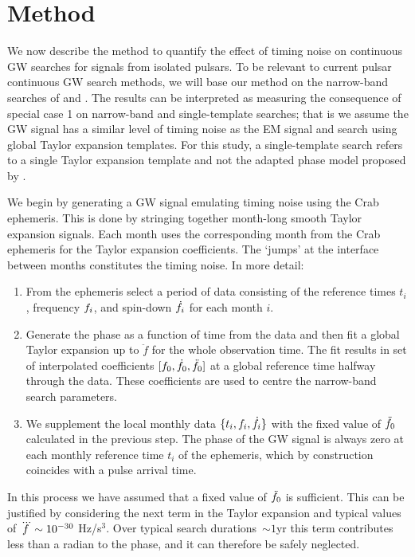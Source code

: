 \documentclass[../full_thesis/full_thesis.tex]{subfiles}
\begin{document}
\section{Method}
\label{sec: narrow-band method}
We now describe the method to quantify the effect of timing noise on continuous GW
searches for signals from isolated pulsars.
To be relevant to current pulsar continuous GW search methods, we will base our
method on the narrow-band searches of \citet{ligo2008} and \citet{ligo2015}. The results can be interpreted as measuring the consequence of
special case 1 on narrow-band and single-template searches; that is we assume
the GW signal has a similar level of timing noise as the EM signal and search
using global Taylor expansion templates. For this study, a single-template
search refers to a single Taylor expansion template and not the adapted phase
model proposed by \citet{Pitkin2004}.

We begin by generating a GW signal emulating timing noise using the Crab
ephemeris. This is done by stringing together month-long smooth Taylor expansion
signals. Each month uses the corresponding month from the Crab
ephemeris for the Taylor expansion coefficients. The `jumps' at the interface
between months constitutes the timing noise.
In more detail:
\begin{enumerate}

\item From the ephemeris select a period of data consisting of the reference
times $t_i$, frequency $f_i$, and spin-down
$\dot{f}_i$ for each month $i$.

\item \label{fit} Generate the phase as a function of time from the data and
then fit a global Taylor expansion up to $\ddot{f}$ for the whole
observation time.  The fit results in set of interpolated coefficients
$[f_{0}, \dot{f}_{0}, \ddot{f}_{0}]$ at a global reference time halfway through
the data. These coefficients are used to centre the narrow-band search
parameters.

\item We supplement the local monthly data $\{t_i, f_{i}, \dot{f}_{i}\}$ with
the fixed value of $\ddot{f}_{0}$ calculated in the previous step. The phase of
the GW signal is always zero at each monthly reference time $t_i$ of the
ephemeris, which by construction coincides with a pulse arrival time.

\end{enumerate}

In this process we have assumed that a fixed value of $\ddot{f}_{0}$ is
sufficient. This can be justified by considering the next term in the Taylor
expansion and typical values of $\dddot{f} \sim 10^{-30}$
Hz/s$^{3}$.  Over typical search durations~$\sim 1$yr this term contributes
less than a radian to the phase, and it can therefore be safely neglected.
\end{document}
